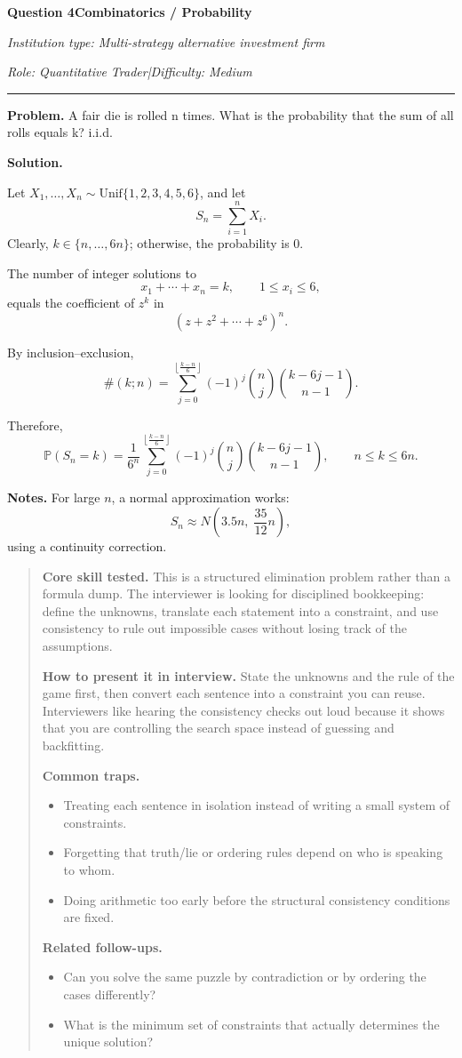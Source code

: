 \documentclass[11pt,letterpaper,openany]{book}
\newenvironment{EditorialNote}
  {\begin{quote}\small\setlength{\parskip}{0.25em}}
  {\end{quote}}
\newcommand{\QuestionSpacer}{\vspace{0.4em}}
\newcommand{\InterviewQuestionHeader}[5]{%
  \vspace{1.0em}%
  {\large\bfseries #1\enspace #4\par}%
  {\small\itshape Institution type: #2\par}%
  {\small\itshape Role: #3\enspace |\enspace Difficulty: #5\par}%
  \vspace{0.25em}\hrule\vspace{0.45em}%
}
\begin{document}
\InterviewQuestionHeader{Question 4}{Multi-strategy alternative investment firm}{Quantitative Trader}{Combinatorics / Probability}{Medium}
\textbf{Problem.} A fair die is rolled n times. What is the probability that the sum of all rolls equals k? i.i.d.

\textbf{Solution.}

Let \(X_1, \dots, X_n \sim \mathrm{Unif}\{1,2,3,4,5,6\}\), and let
\[
S_n = \sum_{i=1}^n X_i.
\]
Clearly, \(k \in \{n, \dots, 6n\}\); otherwise, the probability is \(0\).

The number of integer solutions to
\[
x_1 + \cdots + x_n = k, \qquad 1 \le x_i \le 6,
\]
equals the coefficient of \(z^k\) in
\[
(z + z^2 + \cdots + z^6)^n.
\]

By inclusion--exclusion,
\[
\#(k;n)
=
\sum_{j=0}^{\left\lfloor \frac{k-n}{6} \right\rfloor}
(-1)^j \binom{n}{j}\binom{k-6j-1}{n-1}.
\]

Therefore,
\[
\mathbb{P}(S_n = k)
=
\frac{1}{6^n}
\sum_{j=0}^{\left\lfloor \frac{k-n}{6} \right\rfloor}
(-1)^j \binom{n}{j}\binom{k-6j-1}{n-1},
\qquad n \le k \le 6n.
\]

\textbf{Notes.} For large \(n\), a normal approximation works:
\[
S_n \approx N\!\left(3.5n,\; \frac{35}{12}n\right),
\]
using a continuity correction.

\begin{EditorialNote}


\textbf{Core skill tested.} This is a structured elimination problem rather than a formula dump. The interviewer is looking for disciplined bookkeeping: define the unknowns, translate each statement into a constraint, and use consistency to rule out impossible cases without losing track of the assumptions.

\textbf{How to present it in interview.} State the unknowns and the rule of the game first, then convert each sentence into a constraint you can reuse. Interviewers like hearing the consistency checks out loud because it shows that you are controlling the search space instead of guessing and backfitting.

\textbf{Common traps.}
\begin{itemize}
\item Treating each sentence in isolation instead of writing a small system of constraints.
\item Forgetting that truth/lie or ordering rules depend on who is speaking to whom.
\item Doing arithmetic too early before the structural consistency conditions are fixed.
\end{itemize}

\textbf{Related follow-ups.}
\begin{itemize}
\item Can you solve the same puzzle by contradiction or by ordering the cases differently?
\item What is the minimum set of constraints that actually determines the unique solution?
\end{itemize}


\end{EditorialNote}
\QuestionSpacer
\end{document}
